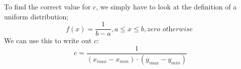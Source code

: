 To find the correct value for $c$, we simply have to look at the definition of a uniform distribution;
$$
f(x) = \frac{1}{b-a}, a \leq x \leq b, \textit{zero otherwise }
$$
We can use this to write out $c$:
$$
c = \frac{1}{(x_{max}-x_{min}) \cdot (y_{max}-y_{min})}
$$